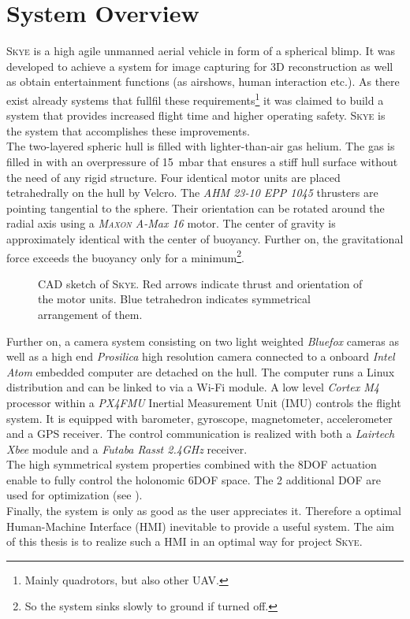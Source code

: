 \section{System Overview}
\label{sec:system overview}
\textsc{Skye} is a high agile unmanned aerial vehicle in form of a spherical blimp. It was developed to achieve a system for image capturing for 3D reconstruction as well as obtain entertainment functions (as airshows, human interaction etc.). As there exist already systems that fullfil these requirements\footnote{Mainly quadrotors, but also other UAV.} it was claimed to build a system that provides increased flight time and higher operating safety. \textsc{Skye} is the system that accomplishes these improvements. \\
The two-layered spheric hull is filled with lighter-than-air gas helium. The gas is filled in with an overpressure of \SI{15}{\milli\bar} that ensures a stiff hull surface without the need of any rigid structure. Four identical motor units are placed tetrahedrally on the hull by Velcro. The \textit{AHM 23-10 EPP 1045} thrusters are pointing tangential to the sphere. Their orientation can be rotated around the radial axis using a \textit{\textsc{Maxon} A-Max 16} motor. The center of gravity is approximately identical with the center of buoyancy. Further on, the gravitational force exceeds the buoyancy only for a minimum\footnote{So the system sinks slowly to ground if turned off.}.
\begin{figure}[H]
    \centering
    \def\svgwidth{0.8\columnwidth}
    
    \caption{CAD sketch of \textsc{Skye}. Red arrows indicate thrust and orientation of the motor units. Blue tetrahedron indicates symmetrical arrangement of them. }
    \label{fig:scene_trajectoryFollowing}
\end{figure}
Further on, a camera system consisting on two light weighted \textit{Bluefox} cameras as well as a high end \textit{Prosilica} high resolution camera connected to a onboard \textit{Intel Atom} embedded computer are detached on the hull. The computer runs a Linux distribution and can be linked to via a Wi-Fi module. A low level \textit{Cortex M4} processor within a \textit{PX4FMU} Inertial Measurement Unit (IMU) controls the flight system. It is equipped with barometer, gyroscope, magnetometer, accelerometer and a GPS receiver. The control communication is realized with both a \textit{Lairtech Xbee} module and a \textit{Futaba Rasst 2.4GHz} receiver. \\
The high symmetrical system properties combined with the 8DOF actuation enable to fully control the holonomic 6DOF space. The 2 additional DOF are used for optimization (see \cite{schaffnervu}).  \\
Finally, the system is only as good as the user appreciates it. Therefore a optimal Human-Machine Interface (HMI) inevitable to provide a useful system. The aim of this thesis is to realize such a HMI in an optimal way for project \textsc{Skye}.
